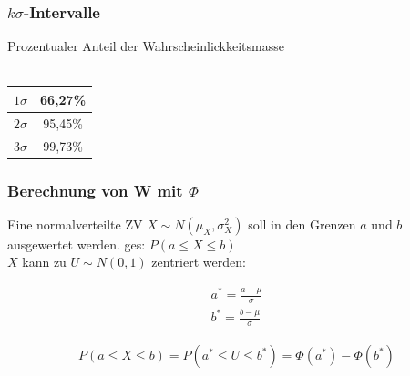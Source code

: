 \documentclass[10pt,a4paper]{article}
\begin{document}
\subsubsection{$k\sigma$-Intervalle}
Prozentualer Anteil der Wahrscheinlickkeitsmasse
  \begin{mdframed}[style=exercise]
    \begin{align}
        [\mu -k\sigma , \mu + k\sigma]
    \end{align}
  \end{mdframed}
    \begin{center}
        \begin{tabular}{ |c|c| } 
         \hline
            $1\sigma$ & 66,27\% \\ 
         \hline
            $2\sigma$ & 95,45\% \\ 
         \hline
            $3\sigma$ & 99,73\% \\ 
         \hline
        \end{tabular}
    \end{center}

\subsubsection{Berechnung von W mit $\Phi$}
Eine normalverteilte ZV $X\sim N(\mu_X,\sigma^2_X)$ soll in den Grenzen $a$ 
und $b$ ausgewertet werden. ges: $P(a\leq X \leq b)$ \\
$X$ kann zu $U\sim N(0,1)$ zentriert werden:
  \begin{mdframed}[style=exercise]
    \begin{align}
        a^* = \frac{a-\mu}{\sigma}\\
        b^* = \frac{b-\mu}{\sigma}
    \end{align}
  \end{mdframed}

  \begin{mdframed}[style=exercise]
    \begin{align}
        P(a\leq X \leq b) = P(a^*\leq U \leq b^*) =
        \Phi(a^*) - \Phi(b^*)
    \end{align}
  \end{mdframed}
\end{document}

